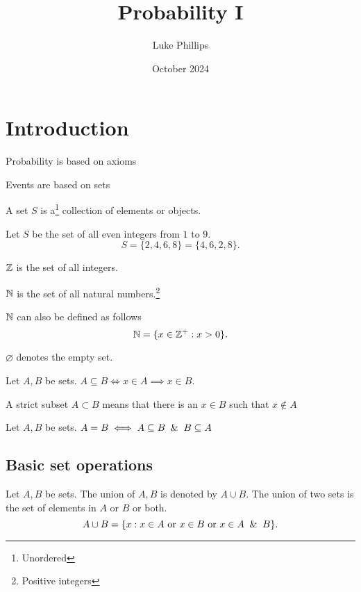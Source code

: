 \documentclass[10pt, a4paper]{article}
\title{Probability I}
\author{Luke Phillips}
\date{October 2024}
\begin{document}
\maketitle

\newpage

\section{Introduction}

Probability is based on axioms


Events are based on sets

\begin{definition}
    A set $S$ is a\footnote{Unordered} collection of elements or objects.    
\end{definition}
\begin{example}
    Let $S$ be the set of all even integers from $1$ to $9$.
    \[
    S =  \{2, 4, 6, 8\} = \{4, 6, 2, 8\}.
    \]
\end{example}

$\mathbb{Z}$ is the set of all integers.

$\mathbb{N}$ is the set of all natural numbers.\footnote{Positive integers}

$\mathbb{N}$ can also be defined as follows
\[
\mathbb{N} = \{x \in \mathbb{Z}^+: x > 0\}.
\]

$\varnothing$ denotes the empty set.

\begin{definition}
    Let $A, B$ be sets. $A \subseteq B \iff x \in A \implies x \in B$.

    A strict subset $A \subset B$ means that there is an $x \in B$ such that $x \notin A$ 
\end{definition}

\begin{definition}
    Let $A, B$ be sets. $A = B \iff A\subseteq B \And B \subseteq A$
\end{definition}

\subsection{Basic set operations}

\begin{definition}
    Let $A, B$ be sets. The union of $A, B$ is denoted by $A \cup B$. The union of two sets is the set of elements in $A$ or $B$ or both.
    \[
    A \cup B = \{x: x \in A \text{ or } x \in B \text{ or } x \in A\And B\}.
    \]
\end{definition}
\end{document}
